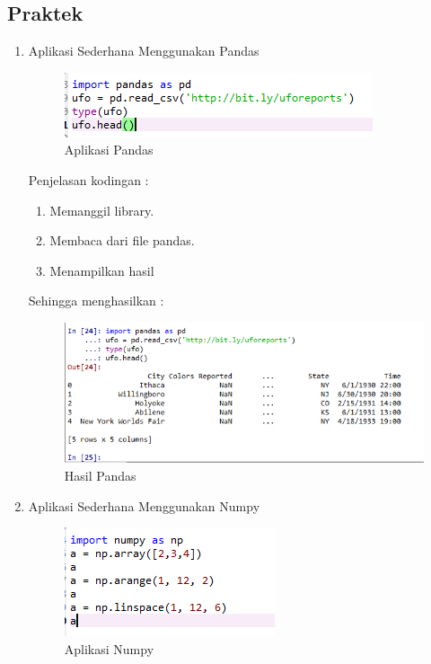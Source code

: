 \subsection{Praktek}
\begin{enumerate}
\item Aplikasi Sederhana Menggunakan Pandas
	\begin{figure}[!hbtp]
	\centering
	\includegraphics[scale=0.5]{figures/AIP/ai1.PNG}
	\caption{Aplikasi Pandas}
	\label{contoh}
	\end{figure}
	\par Penjelasan kodingan :
		\begin{enumerate}
		\item Memanggil library.
		\item Membaca dari file pandas.
		\item Menampilkan hasil
		\end{enumerate}
	\par Sehingga menghasilkan :
	\begin{figure}[!hbtp]
	\centering
	\includegraphics[scale=0.5]{figures/AIP/ai2.PNG}
	\caption{Hasil Pandas}
	\label{contoh}
	\end{figure}
\item Aplikasi Sederhana Menggunakan Numpy
	\begin{figure}[!hbtp]
	\centering
	\includegraphics[scale=0.5]{figures/AIP/ai3.PNG}
	\caption{Aplikasi Numpy}
	\label{contoh}

\end{figure}
\end{enumerate}
